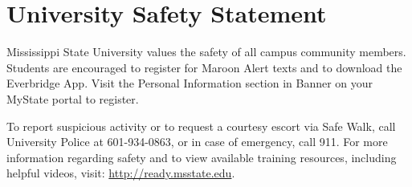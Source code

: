 \section{University Safety Statement}

Mississippi State University values the safety of all campus community members. Students are encouraged to register for Maroon Alert texts and to download the Everbridge App. Visit the Personal Information section in Banner on your MyState portal to register. 

To report suspicious activity or to request a courtesy escort via Safe Walk, call University Police at 601-934-0863, or in case of emergency, call 911. For more information regarding safety and to view available training resources, including helpful videos, visit: \url{http://ready.msstate.edu}.
